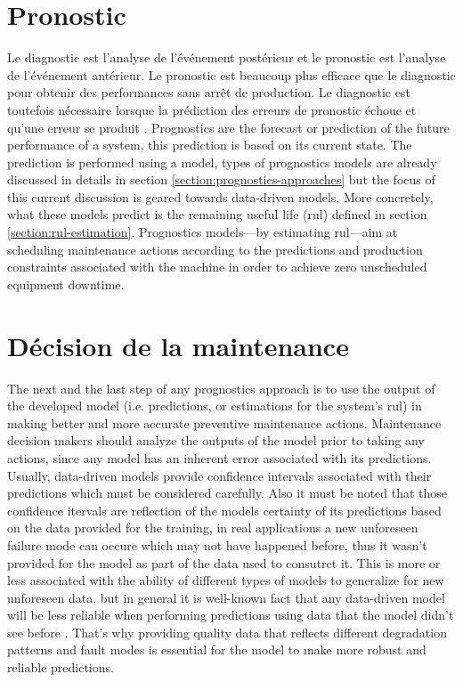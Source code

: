 \section{Pronostic}
Le diagnostic est l'analyse de l'événement postérieur et le pronostic est l'analyse de l'événement antérieur. Le pronostic est beaucoup plus efficace que le diagnostic pour obtenir des performances sans arrêt de production. Le diagnostic est toutefois nécessaire lorsque la prédiction des erreurs de pronostic échoue et qu'une erreur se produit \cite{Jardine2006}.
Prognostics are the forecast or prediction of the future performance of a system, this prediction is based on its current state. The prediction is performed using a model, types of prognostics models are already discussed in details in section \ref{section:prognostics-approaches} but the focus of this current discussion is geared towards data-driven models. More concretely, what these models predict is the remaining useful life (\acrshort{rul}) defined in section \ref{section:rul-estimation}. Prognostics models—by estimating \acrshort{rul}—aim at scheduling maintenance actions according to the predictions and production constraints associated with the machine in order to achieve zero unscheduled equipment downtime.

\section{Décision de la maintenance}
The next and the last step of any prognostics approach is to use the output of the developed model (i.e. predictions, or estimations for the system's \acrshort{rul}) in making better and more accurate preventive maintenance actions. Maintenance decision makers should analyze the outputs of the model prior to taking any actions, since any model has an inherent error associated with its predictions. Usually, data-driven models provide confidence intervals associated with their predictions which must be considered carefully. Also it must be noted that those confidence itervals are reflection of the models certainty of its predictions based on the data provided for the training, in real applications a new unforeseen failure mode can occure which may not have happened before, thus it wasn't provided for the model as part of the data used to consutrct it. This is more or less associated with the ability of different types of models to generalize for new unforeseen data, but in general it is well-known fact that any data-driven model will be less reliable when performing predictions using data that the model didn't see before \cite{Chung2018}. That's why providing quality data that reflects different degradation patterns and fault modes is essential for the model to make more robust and reliable predictions.

